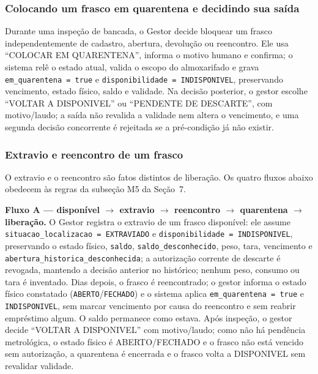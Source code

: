 \subsubsection{Colocando um frasco em quarentena e decidindo sua saída}
Durante uma inspeção de bancada, o Gestor decide bloquear um frasco independentemente de cadastro, abertura, devolução ou reencontro. Ele usa ``COLOCAR EM QUARENTENA'', informa o motivo humano e confirma; o sistema relê o estado atual, valida o escopo do almoxarifado e grava \texttt{em\_quarentena = true} e \texttt{disponibilidade = INDISPONIVEL}, preservando vencimento, estado físico, saldo e validade. Na decisão posterior, o gestor escolhe ``VOLTAR A DISPONIVEL'' ou ``PENDENTE DE DESCARTE'', com motivo/laudo; a saída não revalida a validade nem altera o vencimento, e uma segunda decisão concorrente é rejeitada se a pré-condição já não existir.

\subsubsection{Extravio e reencontro de um frasco}
O extravio e o reencontro são fatos distintos de liberação. Os quatro fluxos abaixo obedecem às regras da subseção M5 da Seção~7.

\textbf{Fluxo A --- disponível $\rightarrow$ extravio $\rightarrow$ reencontro $\rightarrow$ quarentena $\rightarrow$ liberação.} O Gestor registra o extravio de um frasco disponível: ele assume \texttt{situacao\_localizacao = EXTRAVIADO} e \texttt{disponibilidade = INDISPONIVEL}, preservando o estado físico, \texttt{saldo}, \texttt{saldo\_desconhecido}, peso, tara, vencimento e \texttt{abertura\_historica\_desconhecida}; a autorização corrente de descarte é revogada, mantendo a decisão anterior no histórico; nenhum peso, consumo ou tara é inventado. Dias depois, o frasco é reencontrado; o gestor informa o estado físico constatado (\texttt{ABERTO}/\texttt{FECHADO}) e o sistema aplica \texttt{em\_quarentena = true} e \texttt{INDISPONIVEL}, sem marcar vencimento por causa do reencontro e sem reabrir empréstimo algum. O saldo permanece como estava. Após inspeção, o gestor decide ``VOLTAR A DISPONIVEL'' com motivo/laudo; como não há pendência metrológica, o estado físico é ABERTO/FECHADO e o frasco não está vencido sem autorização, a quarentena é encerrada e o frasco volta a DISPONIVEL sem revalidar validade.

